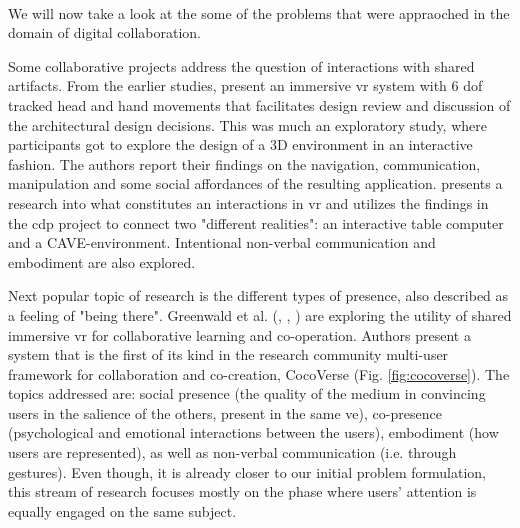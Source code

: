 \paragraph[Related Work]{}
We will now take a look at the some of the problems that were appraoched in the domain of digital collaboration.

Some collaborative projects address the question of interactions with shared artifacts. From the earlier studies, \cite{davidson_greenspace_1996} present an immersive \gls{vr} system with 6 \gls{dof} tracked head and hand movements that facilitates design review and discussion of the architectural design decisions. This was much an exploratory study, where participants got to explore the design of a 3D environment in an interactive fashion. The authors report their findings on the navigation, communication, manipulation and some social affordances of the resulting application.
\cite{lena_real-time_nodate} presents a research into what constitutes an interactions in \gls{vr} and utilizes the findings in the \gls{cdp} project to connect two "different realities": an interactive table computer and a CAVE-environment. Intentional non-verbal communication and embodiment are also explored.

Next popular topic of research is the different types of presence, also described as a feeling of "being there".
Greenwald et al. (\cite{greenwald_cocoverse_nodate}, \cite{greenwald_investigating_2017}, \cite{greenwald_technology_2017}) are exploring the utility of shared immersive \gls{vr} for collaborative learning and co-operation. Authors present a system that is the first of its kind in the research community multi-user framework for collaboration and co-creation, CocoVerse (Fig. \ref{fig:cocoverse}). The topics addressed are: social presence (the quality of the medium in convincing users in the salience of the others, present in the same \gls{ve}), co-presence (psychological and emotional interactions between the users), embodiment (how users are represented), as well as non-verbal communication (i.e. through gestures).
Even though, it is already closer to our initial problem formulation, this stream of research focuses mostly on the phase where users' attention is equally engaged on the same subject.

